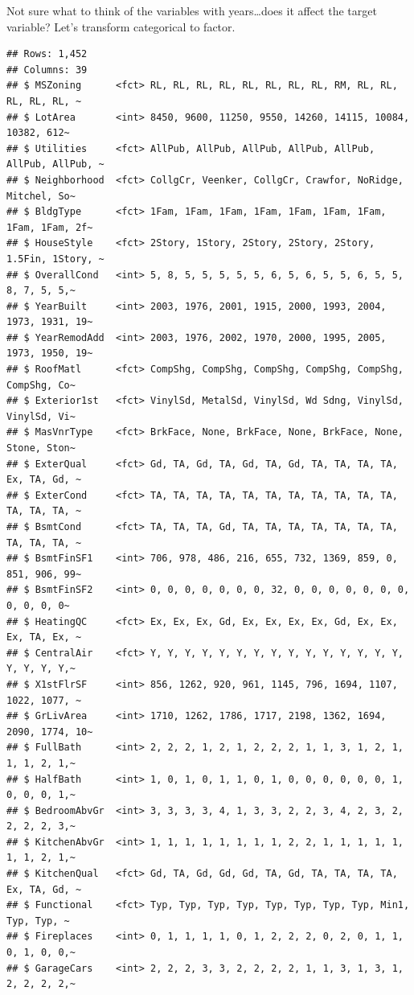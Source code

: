 \documentclass[
]{article}
\begin{document}
Not sure what to think of the variables with years\ldots does it affect
the target variable? Let's transform categorical to factor.

\begin{verbatim}
## Rows: 1,452
## Columns: 39
## $ MSZoning      <fct> RL, RL, RL, RL, RL, RL, RL, RL, RM, RL, RL, RL, RL, RL, ~
## $ LotArea       <int> 8450, 9600, 11250, 9550, 14260, 14115, 10084, 10382, 612~
## $ Utilities     <fct> AllPub, AllPub, AllPub, AllPub, AllPub, AllPub, AllPub, ~
## $ Neighborhood  <fct> CollgCr, Veenker, CollgCr, Crawfor, NoRidge, Mitchel, So~
## $ BldgType      <fct> 1Fam, 1Fam, 1Fam, 1Fam, 1Fam, 1Fam, 1Fam, 1Fam, 1Fam, 2f~
## $ HouseStyle    <fct> 2Story, 1Story, 2Story, 2Story, 2Story, 1.5Fin, 1Story, ~
## $ OverallCond   <int> 5, 8, 5, 5, 5, 5, 5, 6, 5, 6, 5, 5, 6, 5, 5, 8, 7, 5, 5,~
## $ YearBuilt     <int> 2003, 1976, 2001, 1915, 2000, 1993, 2004, 1973, 1931, 19~
## $ YearRemodAdd  <int> 2003, 1976, 2002, 1970, 2000, 1995, 2005, 1973, 1950, 19~
## $ RoofMatl      <fct> CompShg, CompShg, CompShg, CompShg, CompShg, CompShg, Co~
## $ Exterior1st   <fct> VinylSd, MetalSd, VinylSd, Wd Sdng, VinylSd, VinylSd, Vi~
## $ MasVnrType    <fct> BrkFace, None, BrkFace, None, BrkFace, None, Stone, Ston~
## $ ExterQual     <fct> Gd, TA, Gd, TA, Gd, TA, Gd, TA, TA, TA, TA, Ex, TA, Gd, ~
## $ ExterCond     <fct> TA, TA, TA, TA, TA, TA, TA, TA, TA, TA, TA, TA, TA, TA, ~
## $ BsmtCond      <fct> TA, TA, TA, Gd, TA, TA, TA, TA, TA, TA, TA, TA, TA, TA, ~
## $ BsmtFinSF1    <int> 706, 978, 486, 216, 655, 732, 1369, 859, 0, 851, 906, 99~
## $ BsmtFinSF2    <int> 0, 0, 0, 0, 0, 0, 0, 32, 0, 0, 0, 0, 0, 0, 0, 0, 0, 0, 0~
## $ HeatingQC     <fct> Ex, Ex, Ex, Gd, Ex, Ex, Ex, Ex, Gd, Ex, Ex, Ex, TA, Ex, ~
## $ CentralAir    <fct> Y, Y, Y, Y, Y, Y, Y, Y, Y, Y, Y, Y, Y, Y, Y, Y, Y, Y, Y,~
## $ X1stFlrSF     <int> 856, 1262, 920, 961, 1145, 796, 1694, 1107, 1022, 1077, ~
## $ GrLivArea     <int> 1710, 1262, 1786, 1717, 2198, 1362, 1694, 2090, 1774, 10~
## $ FullBath      <int> 2, 2, 2, 1, 2, 1, 2, 2, 2, 1, 1, 3, 1, 2, 1, 1, 1, 2, 1,~
## $ HalfBath      <int> 1, 0, 1, 0, 1, 1, 0, 1, 0, 0, 0, 0, 0, 0, 1, 0, 0, 0, 1,~
## $ BedroomAbvGr  <int> 3, 3, 3, 3, 4, 1, 3, 3, 2, 2, 3, 4, 2, 3, 2, 2, 2, 2, 3,~
## $ KitchenAbvGr  <int> 1, 1, 1, 1, 1, 1, 1, 1, 2, 2, 1, 1, 1, 1, 1, 1, 1, 2, 1,~
## $ KitchenQual   <fct> Gd, TA, Gd, Gd, Gd, TA, Gd, TA, TA, TA, TA, Ex, TA, Gd, ~
## $ Functional    <fct> Typ, Typ, Typ, Typ, Typ, Typ, Typ, Typ, Min1, Typ, Typ, ~
## $ Fireplaces    <int> 0, 1, 1, 1, 1, 0, 1, 2, 2, 2, 0, 2, 0, 1, 1, 0, 1, 0, 0,~
## $ GarageCars    <int> 2, 2, 2, 3, 3, 2, 2, 2, 2, 1, 1, 3, 1, 3, 1, 2, 2, 2, 2,~

\end{verbatim}
\end{document}
